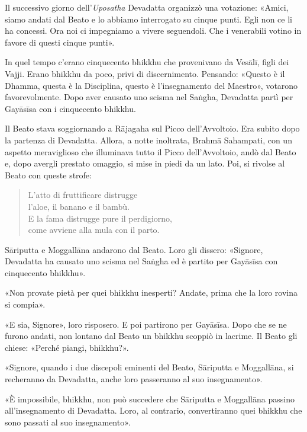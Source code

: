Il successivo giorno dell’\emph{Uposatha} Devadatta organizzò una votazione:
«Amici, siamo andati dal Beato e lo abbiamo interrogato su cinque punti. Egli
non ce li ha concessi. Ora noi ci impegniamo a vivere seguendoli. Che i
venerabili votino in favore di questi cinque punti».

In quel tempo c’erano cinquecento bhikkhu che provenivano da Vesālī, figli dei
Vajji. Erano bhikkhu da poco, privi di discernimento. Pensando: «Questo è il
Dhamma, questa è la Disciplina, questo è l’insegnamento del Maestro», votarono
favorevolmente. Dopo aver causato uno scisma nel Saṅgha, Devadatta partì per
Gayāsīsa con i cinquecento bhikkhu.


 Il Beato stava soggiornando a Rājagaha sul Picco
dell’Avvoltoio. Era subito dopo la partenza di Devadatta. Allora, a notte
inoltrata, Brahmā Sahampati, con un aspetto meraviglioso che illuminava tutto il
Picco dell’Avvoltoio, andò dal Beato e, dopo avergli prestato omaggio, si mise
in piedi da un lato. Poi, si rivolse al Beato con queste strofe:

\begin{quote}
L’atto di fruttificare distrugge \\
l’aloe, il banano e il bambù. \\
E la fama distrugge pure il perdigiorno, \\
come avviene alla mula con il parto.
\end{quote}


 Sāriputta e Moggallāna andarono dal Beato. Loro gli
dissero: «Signore, Devadatta ha causato uno scisma nel Saṅgha ed è partito per
Gayāsīsa con cinquecento bhikkhu».

«Non provate pietà per quei bhikkhu inesperti? Andate, prima che la loro rovina
si compia».

«E sia, Signore», loro risposero. E poi partirono per Gayāsīsa. Dopo che se ne
furono andati, non lontano dal Beato un bhikkhu scoppiò in lacrime. Il Beato gli
chiese: «Perché piangi, bhikkhu?».

«Signore, quando i due discepoli eminenti del Beato, Sāriputta e Moggallāna, si
recheranno da Devadatta, anche loro passeranno al suo insegnamento».

«È impossibile, bhikkhu, non può succedere che Sāriputta e Moggallāna passino
all’insegnamento di Devadatta. Loro, al contrario, convertiranno quei bhikkhu
che sono passati al suo insegnamento».

